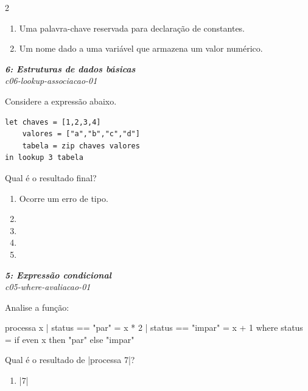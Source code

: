 \documentclass[a4paper,10pt,brazil]{article}
\begin{document}
\begin{multicols}{2}
\begin{enumerate}
  \item Uma palavra-chave reservada para declaração de constantes.

  \item Um nome dado a uma variável que armazena um valor numérico.


\end{enumerate}

\begin{flushright}
  \footnotesize
  \textit{\textbf{6: Estruturas de dados básicas}}\\
  \textit{c06-lookup-associacao-01}\\

\end{flushright}
Considere a expressão abaixo.
\begin{verbatim}
let chaves = [1,2,3,4]
    valores = ["a","b","c","d"]
    tabela = zip chaves valores
in lookup 3 tabela
\end{verbatim}
Qual é o resultado final?

\begin{enumerate}
  \item Ocorre um erro de tipo.

  \item {}

  \item {}

  \item {}

  \item {}


\end{enumerate}

\begin{flushright}
  \footnotesize
  \textit{\textbf{5: Expressão condicional}}\\
  \textit{c05-where-avaliacao-01}\\

\end{flushright}
Analise a função:
\begin{haskellcode}
processa x
  | status == "par"   = x * 2
  | status == "impar" = x + 1
  where
    status = if even x then "par" else "impar"
\end{haskellcode}
Qual é o resultado de \haskellinline|processa 7|?

\begin{enumerate}
  \item \haskellinline|7|


\end{enumerate}
\end{multicols}
\end{document}
